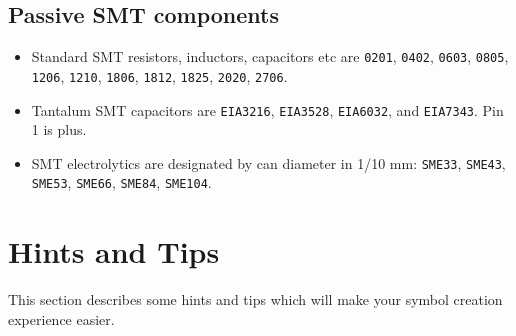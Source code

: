 \documentclass{article}
\begin{document}
\subsection{Passive SMT components}
\begin{itemize}
\item   Standard SMT resistors, inductors, capacitors etc are {\tt 0201},
	{\tt 0402}, {\tt 0603}, {\tt 0805}, {\tt 1206}, {\tt 1210}, 
	{\tt 1806}, {\tt 1812}, {\tt 1825}, {\tt 2020}, {\tt 2706}.

\item   Tantalum SMT capacitors are {\tt EIA3216}, {\tt EIA3528},
	{\tt EIA6032}, and {\tt EIA7343}. Pin 1 is plus.

\item   SMT electrolytics are designated by can diameter in 1/10 mm:
	{\tt SME33}, {\tt SME43}, {\tt SME53}, {\tt SME66}, {\tt SME84},
	{\tt SME104}.
\end{itemize}

\section{Hints and Tips}

This section describes some hints and tips which will make your symbol
creation experience easier.
\end{document}
